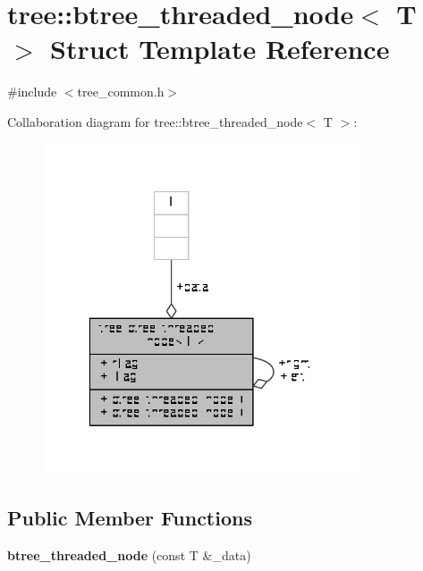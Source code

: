 \hypertarget{structtree_1_1btree__threaded__node}{\section{tree\-:\-:btree\-\_\-threaded\-\_\-node$<$ T $>$ Struct Template Reference}
\label{structtree_1_1btree__threaded__node}
}


{\ttfamily \#include $<$tree\-\_\-common.\-h$>$}



Collaboration diagram for tree\-:\-:btree\-\_\-threaded\-\_\-node$<$ T $>$\-:
\nopagebreak
\begin{figure}[H]
\begin{center}
\leavevmode
\includegraphics[width=265pt]{structtree_1_1btree__threaded__node__coll__graph}
\end{center}
\end{figure}
\subsection*{Public Member Functions}
\begin{DoxyCompactItemize}
\item 
\hypertarget{structtree_1_1btree__threaded__node_a2752127b5320f35b87cd1e347db586f5}{{\bfseries btree\-\_\-threaded\-\_\-node} (const T \&\-\_\-data)}\label{structtree_1_1btree__threaded__node_a2752127b5320f35b87cd1e347db586f5}

\end{DoxyCompactItemize}
